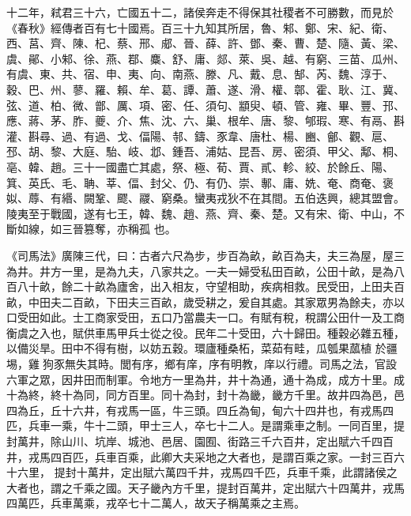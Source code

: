 \begin{pinyinscope}
 十二年，弒君三十六，亡國五十二，諸侯奔走不得保其社稷者不可勝數，而見於《春秋》經傳者百有七十國焉。百三十九知其所居，魯、邾、鄭、宋、紀、衛、西、莒、齊、陳、杞、蔡、邢、郕、晉、薛、許、鄧、秦、曹、楚、隨、黃、梁、虞、鄖、小邾、徐、燕、鄀、麋、舒、庸、郯、萊、吳、越、有窮、三苗、瓜州、有虞、東、共、宿、申、夷、向、南燕、滕、凡、戴、息、郜、芮、魏、淳于、穀、巴、州、蓼、羅、賴、牟、葛、譚、蕭、遂、滑、權、鄣、霍、耿、江、冀、弦、道、柏、微、鄫、厲、項、密、任、須句、顓臾、頓、管、雍、畢、豐、邘、應、蔣、茅、胙、夔、介、焦、沈、六、巢、根牟、唐、黎、郇瑕、寒、有鬲、斟灌、斟尋、過、有過、戈、偪陽、邿、鑄、豕韋、唐杜、楊、豳、鄶、觀、扈、邳、胡、黎、大庭、駘、岐、邶、鍾吾、浦姑、昆吾、房、密須、甲父、鄅、桐、亳、韓、趙。三十一國盡亡其處，祭、極、荀、賈、貳、軫、絞、於餘丘、陽、箕、英氏、毛、聃、莘、偪、封父、仍、有仍、崇、鄟、庸、姺、奄、商奄、褒姒、蓐、有緡、闕鞏、飂、鬷、窮桑。蠻夷戎狄不在其間。五伯迭興，總其盟會。陵夷至于戰國，遂有七王，韓、魏、趙、燕、齊、秦、楚。又有宋、衛、中山，不斷如線，如三晉篡奪，亦稱孤
 也。



 《司馬法》廣陳三代，曰：古者六尺為步，步百為畝，畝百為夫，夫三為屋，屋三為井。井方一里，是為九夫，八家共之。一夫一婦受私田百畝，公田十畝，是為八百八十畝，餘二十畝為廬舍，出入相友，守望相助，疾病相救。民受田，上田夫百畝，中田夫二百畝，下田夫三百畝，歲受耕之，爰自其處。其家眾男為餘夫，亦以口受田如此。士工商家受田，五口乃當農夫一口。有賦有稅，稅謂公田什一及工商衡虞之入也，賦供車馬甲兵士從之役。民年二十受田，六十歸田。種穀必雜五種，以備災旱。田中不得有樹，以妨五穀。環廬種桑柘，菜茹有畦，瓜瓠果蓏植
 於疆埸，雞狗豕無失其時。閭有序，鄉有庠，序有明教，庠以行禮。司馬之法，官設六軍之眾，因井田而制軍。令地方一里為井，井十為通，通十為成，成方十里。成十為終，終十為同，同方百里。同十為封，封十為畿，畿方千里。故井四為邑，邑四為丘，丘十六井，有戎馬一區，牛三頭。四丘為甸，甸六十四井也，有戎馬四匹，兵車一乘，牛十二頭，甲士三人，卒七十二人。是謂乘車之制。一同百里，提封萬井，除山川、坑岸、城池、邑居、園囿、街路三千六百井，定出賦六千四百井，戎馬四百匹，兵車百乘，此卿大夫采地之大者也，是謂百乘之家。一封三百六十六里，
 提封十萬井，定出賦六萬四千井，戎馬四千匹，兵車千乘，此謂諸侯之大者也，謂之千乘之國。天子畿內方千里，提封百萬井，定出賦六十四萬井，戎馬四萬匹，兵車萬乘，戎卒七十二萬人，故天子稱萬乘之主焉。




\end{pinyinscope}

